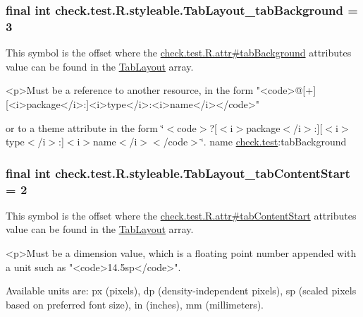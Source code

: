 \subsubsection[{Tab\+Layout\+\_\+tab\+Background}]{\setlength{\rightskip}{0pt plus 5cm}final int check.\+test.\+R.\+styleable.\+Tab\+Layout\+\_\+tab\+Background = 3\hspace{0.3cm}{\ttfamily [static]}}\label{classcheck_1_1test_1_1_r_1_1styleable_a841fbc3f9478cc8cb55372aafdab6dcb}
This symbol is the offset where the \hyperlink{classcheck_1_1test_1_1_r_1_1attr_a90d48386b6c277d4bb8f496ca85d7fa4}{check.\+test.\+R.\+attr\#tab\+Background} attribute\textquotesingle{}s value can be found in the \hyperlink{classcheck_1_1test_1_1_r_1_1styleable_a2a3232e8d38a43f5131a16385abbbed8}{Tab\+Layout} array.

\begin{DoxyVerb}      <p>Must be a reference to another resource, in the form "<code>@[+][<i>package</i>:]<i>type</i>:<i>name</i></code>"
\end{DoxyVerb}
 or to a theme attribute in the form \char`\"{}$<$code$>$?\mbox{[}$<$i$>$package$<$/i$>$\+:\mbox{]}\mbox{[}$<$i$>$type$<$/i$>$\+:\mbox{]}$<$i$>$name$<$/i$>$$<$/code$>$\char`\"{}.  name \hyperlink{namespacecheck_1_1test}{check.\+test}\+:tab\+Background \hypertarget{classcheck_1_1test_1_1_r_1_1styleable_acfca4d1abebaf4cd27f1340340be23dc}{}
\subsubsection[{Tab\+Layout\+\_\+tab\+Content\+Start}]{\setlength{\rightskip}{0pt plus 5cm}final int check.\+test.\+R.\+styleable.\+Tab\+Layout\+\_\+tab\+Content\+Start = 2\hspace{0.3cm}{\ttfamily [static]}}\label{classcheck_1_1test_1_1_r_1_1styleable_acfca4d1abebaf4cd27f1340340be23dc}
This symbol is the offset where the \hyperlink{classcheck_1_1test_1_1_r_1_1attr_af4fc4df4ea303d1145e27e9279ff4f2e}{check.\+test.\+R.\+attr\#tab\+Content\+Start} attribute\textquotesingle{}s value can be found in the \hyperlink{classcheck_1_1test_1_1_r_1_1styleable_a2a3232e8d38a43f5131a16385abbbed8}{Tab\+Layout} array.

\begin{DoxyVerb}      <p>Must be a dimension value, which is a floating point number appended with a unit such as "<code>14.5sp</code>".
\end{DoxyVerb}
 Available units are\+: px (pixels), dp (density-\/independent pixels), sp (scaled pixels based on preferred font size), in (inches), mm (millimeters). 

